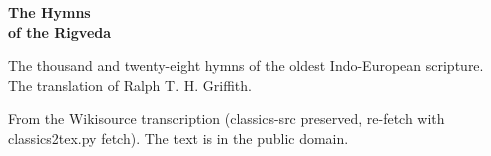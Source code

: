 \documentclass[11pt,letterpaper]{article}
\begin{document}
\color{ink}

\begin{titlepage}
\centering
\vspace*{4em}
{\LARGE\bfseries\color{heading} The Hymns\\[0.3em]of the Rigveda\par}
\vspace{2em}
{\Large\bfseries\color{heading} \par}
\vspace{2.5em}
{\itshape\color{subhead}\parbox{0.8\linewidth}{\centering The thousand and twenty-eight hymns of the oldest Indo-European scripture. The translation of Ralph T. H. Griffith.\par}}
\vfill
{\small From the Wikisource transcription (classics-src preserved, re-fetch with classics2tex.py fetch). The text is in the public domain.\par}
\vspace{2em}
\end{titlepage}

\tableofcontents


\end{document}
